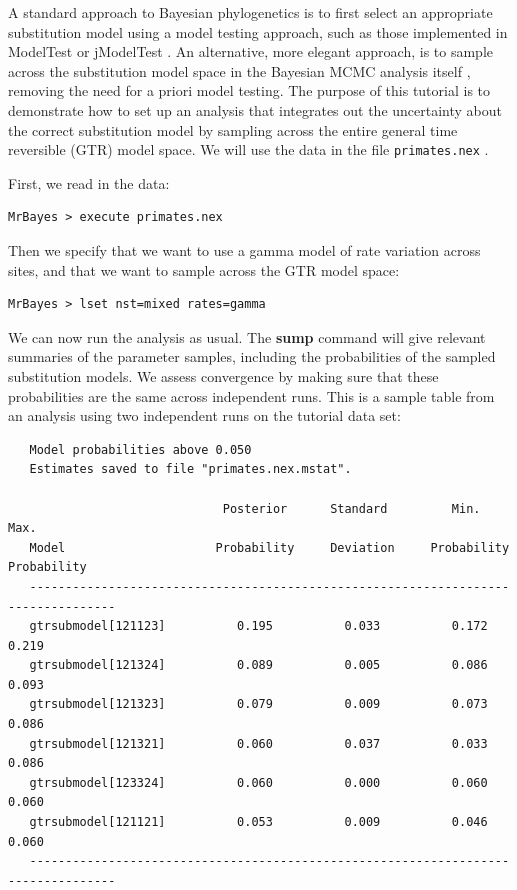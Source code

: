 \documentclass[12pt]{book}
\newcommand{\ttt}[1]{\texttt{#1} }
\begin{document}
A standard approach to Bayesian phylogenetics is to first select an appropriate substitution model using
a model testing approach, such as those implemented in ModelTest or jModelTest \citep{posada98, posada08}. An
alternative, more elegant approach, is to sample across the substitution model space in the Bayesian MCMC
analysis itself \citep{huelsenbeck04d}, removing the need for a priori model testing. The purpose of this
tutorial is to demonstrate how to set up an analysis that integrates out the uncertainty about the correct
substitution model by sampling across the entire general time reversible (GTR) model space.
We will use the data in the file \ttt{primates.nex}.

First, we read in the data:

\begin{verbatim}
MrBayes > execute primates.nex
\end{verbatim}

Then we specify that we want to use a gamma model of rate variation across sites, and that we want to sample
across the GTR model space:

\begin{verbatim}
MrBayes > lset nst=mixed rates=gamma
\end{verbatim}

We can now run the analysis as usual. The \textbf{sump} command will give relevant summaries of the parameter
samples, including the probabilities of the sampled substitution models. We assess convergence by making sure
that these probabilities are the same across independent runs. This is a sample table from an analysis using
two independent runs on the tutorial data set:

\scriptsize
\begin{singlespacing}
\begin{verbatim}
   Model probabilities above 0.050
   Estimates saved to file "primates.nex.mstat".

                              Posterior      Standard         Min.           Max.   
   Model                     Probability     Deviation     Probability    Probability
   ----------------------------------------------------------------------------------
   gtrsubmodel[121123]          0.195          0.033          0.172          0.219
   gtrsubmodel[121324]          0.089          0.005          0.086          0.093
   gtrsubmodel[121323]          0.079          0.009          0.073          0.086
   gtrsubmodel[121321]          0.060          0.037          0.033          0.086
   gtrsubmodel[123324]          0.060          0.000          0.060          0.060
   gtrsubmodel[121121]          0.053          0.009          0.046          0.060
   ----------------------------------------------------------------------------------
\end{verbatim}
\end{singlespacing}
\normalsize
\end{document}
